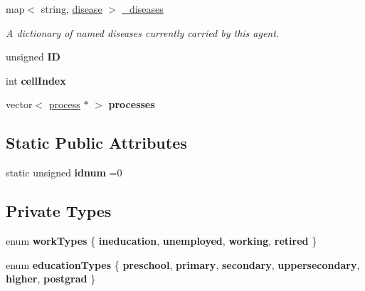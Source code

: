 \begin{DoxyCompactItemize}
map$<$ string, \mbox{\hyperlink{classdisease}{disease}} $>$ \mbox{\hyperlink{classagent_a2352342e95bc77041c07c0dafdfb7cd2}{\+\_\+diseases}}
\begin{DoxyCompactList}\small\item\em A dictionary of named diseases currently carried by this agent. \end{DoxyCompactList}\item 
\mbox{\label{classagent_a7f99e11ffb5c042be84e2917cba7af3a}} 
unsigned {\bfseries ID}
\item 
\mbox{\label{classagent_a3db995cae037474ae4bf7adcb7cd44cc}} 
int {\bfseries cell\+Index}
\item 
\mbox{\label{classagent_a13305f6e66e992cf1c6ffa7b027c4201}} 
vector$<$ \mbox{\hyperlink{classprocess}{process}} $\ast$ $>$ {\bfseries processes}
\end{DoxyCompactItemize}
\subsection*{Static Public Attributes}
\begin{DoxyCompactItemize}
\item 
\mbox{\label{classagent_a4fd7d01331ffd547ae9fc8eb9b05516d}} 
static unsigned {\bfseries idnum} =0
\end{DoxyCompactItemize}
\subsection*{Private Types}
\begin{DoxyCompactItemize}
\item 
\mbox{\label{classagent_a56ecbbe6f1ec07d60ed3c30988810e22}} 
enum {\bfseries work\+Types} \{ {\bfseries ineducation}, 
{\bfseries unemployed}, 
{\bfseries working}, 
{\bfseries retired}
 \}
\item 
\mbox{\label{classagent_a499a1e074636f81ed46fe569107e6cde}} 
enum {\bfseries education\+Types} \{ \newline
{\bfseries preschool}, 
{\bfseries primary}, 
{\bfseries secondary}, 
{\bfseries uppersecondary}, 
\newline
{\bfseries higher}, 
{\bfseries postgrad}
 \}
\end{DoxyCompactItemize}
